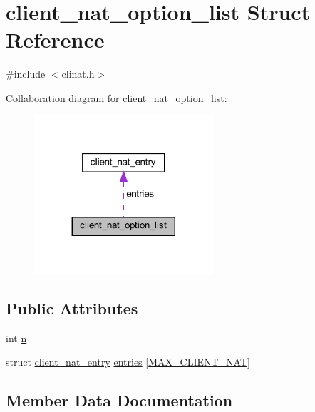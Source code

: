 \hypertarget{structclient__nat__option__list}{}\section{client\+\_\+nat\+\_\+option\+\_\+list Struct Reference}
\label{structclient__nat__option__list}


{\ttfamily \#include $<$clinat.\+h$>$}



Collaboration diagram for client\+\_\+nat\+\_\+option\+\_\+list\+:
\nopagebreak
\begin{figure}[H]
\begin{center}
\leavevmode
\includegraphics[width=188pt]{structclient__nat__option__list__coll__graph}
\end{center}
\end{figure}
\subsection*{Public Attributes}
\begin{DoxyCompactItemize}
\item 
int \hyperlink{structclient__nat__option__list_a8c360f0d8dafbb8ad4c9b59983b8a015}{n}
\item 
struct \hyperlink{structclient__nat__entry}{client\+\_\+nat\+\_\+entry} \hyperlink{structclient__nat__option__list_aacb63fefb0d0ee340c43ba988768e71d}{entries} \mbox{[}\hyperlink{clinat_8h_a708e00b7009d395c3815b6b1d32d91d0}{M\+A\+X\+\_\+\+C\+L\+I\+E\+N\+T\+\_\+\+N\+A\+T}\mbox{]}
\end{DoxyCompactItemize}


\subsection{Member Data Documentation}
\hypertarget{structclient__nat__option__list_aacb63fefb0d0ee340c43ba988768e71d}{}
